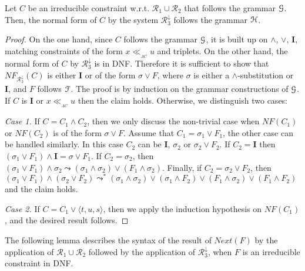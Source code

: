 \documentclass[submission,copyright,creativecommons]{eptcs}
\newcommand \matchth[3]{#1 {\ll}_{{ }_{#3}} {#2}}
\newcommand \matchAC[2]{\matchth{#1}{#2}{AC}}
\newcommand \trip[1]{\langle #1 \rangle}
\newcommand \Ronetwo{\ensuremath{\mathcal{R}_1\cup\mathcal{R}_2}}
\newcommand \Rthree{\ensuremath{\mathcal{R}_3^{\downarrow}}}
\newcommand \Eu[1]{\EuScript{#1}}
\numberwithin{subcase}{case}
\begin{document}
\begin{lemma}
\label{R123:NF:lemma}
Let $C$ be an irreducible  constraint w.r.t. $\mathcal{R}_1\cup \mathcal{R}_2$
 that follows  the grammar $\Eu{G}$. Then, the normal form of $C$ by the system
 $\mathcal{R}_3^{\downarrow}$ follows the grammar $\Eu{H}$.
\end{lemma}
\begin{proof}
On the one hand, since $C$ follows the grammar $\Eu{G}$, it is built
up on $\land$, $\lor$, \textbf{I}, matching constraints of the form
$\matchAC{x}{u}$ and triplets. On the other hand, the normal form of $C$ by
$\mathcal{R}_3^{\downarrow}$  is in DNF. Therefore it is sufficient to show that
$\textit{NF}_{\mathcal{R}_3^{\downarrow}}(C)$ is either \textbf{I} or of the
form $\sigma \lor F$, where $\sigma$ is either a $\land$-substitution or
\textbf{I}, and $F$ follows  $\Eu{F}$. The  proof is by   induction on the
grammar constructions of $\Eu{G}$. If  $C$ is $\textbf{I}$ or $\matchAC{x}{u}$
then the claim holds.
Otherwise, we distinguish two cases:

\noindent \emph{Case 1.} If   $C=C_1 \land C_2$, then we only discuss the
non-trivial case when $\textit{NF}(C_1)$ or $\textit{NF}(C_2)$ is of the form $\sigma\lor F$.
Assume that  $C_1=\sigma_1\lor F_1$, the  other case
can be handled similarly.
In this case $C_2$ can be \textbf{I}, $\sigma_2$ or $\sigma_2\lor F_2$.
If $C_2=\textbf{I}$ then 
$(\sigma_1 \lor F_1)\land \textbf{I}=\sigma \lor F_1$. 
If $C_2=\sigma_2$, then 
$(\sigma_1 \lor F_1)\land \sigma_2 \leadsto 
(\sigma_1\land\sigma_2) \lor (F_1\land \sigma_2)$. 
Finally, if $C_2=\sigma_2 \lor
F_2$, then $(\sigma_1 \lor F_1)\land (\sigma_2 \lor F_2) \leadsto^{*}
      (\sigma_1 \land \sigma_2)\lor (\sigma_1 \land F_2) \lor 
      (F_1 \land\sigma_2) \lor (F_1 \land F_2)$ and the claim holds.

\noindent \emph{Case 2.} If $C=C_1 \lor \trip{t,u,s}$, then  we apply the
induction hypothesis on $\textit{NF}(C_1)$, and the desired result follows. 
\end{proof}

The following lemma describes the syntax of the result of
$\textit{Next}(F)$ by the application of $\Ronetwo$
followed by the application of $\Rthree$, when $F$ is an irreducible
constraint in DNF.
\end{document}
